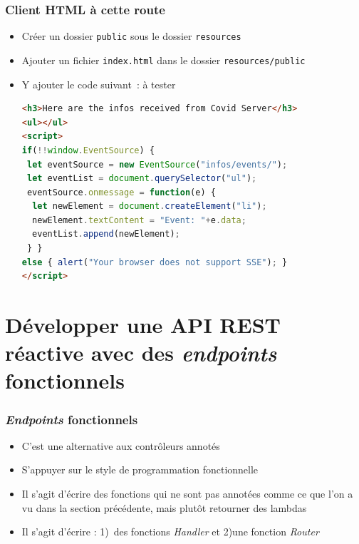 \documentclass{beamer}
\begin{document}
\begin{frame}[fragile]
	\frametitle{Client HTML à cette route}
	\begin{itemize}
		\item Créer un dossier \texttt{public} sous le dossier \texttt{resources}
		\item Ajouter un fichier \texttt{index.html} dans le dossier \texttt{resources/public}
		\item Y ajouter le code suivant~: à tester
\begin{lstlisting}[language=Html]
<h3>Here are the infos received from Covid Server</h3>
<ul></ul>
<script>
if(!!window.EventSource) {
 let eventSource = new EventSource("infos/events/");
 let eventList = document.querySelector("ul");
 eventSource.onmessage = function(e) {
  let newElement = document.createElement("li");
  newElement.textContent = "Event: "+e.data;
  eventList.append(newElement);
 } }
else { alert("Your browser does not support SSE"); }
</script>	
\end{lstlisting}
	\end{itemize}
\end{frame}

\section{Développer une API REST réactive avec des \textit{endpoints} fonctionnels}

\begin{frame}[fragile]
	\frametitle{\textit{Endpoints} fonctionnels}
	\begin{itemize}
		\item C'est une alternative aux contrôleurs annotés
		\item S'appuyer sur le style de programmation fonctionnelle
		\item Il s'agit d'écrire des fonctions qui ne sont pas annotées comme ce que l'on a vu dans la section précédente, mais plutôt retourner des lambdas
		\item Il s'agit d'écrire : 1)~des fonctions \textit{Handler} et 2)une fonction \textit{Router}
	\end{itemize}
\end{frame}
\end{document}
